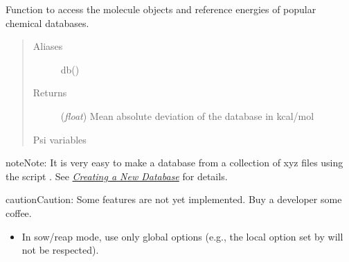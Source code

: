 \documentclass[letterpaper,10pt,english]{sphinxmanual}
\begin{document}
\begin{fulllineitems}
\label{index:wrappers.database}
Function to access the molecule objects and reference energies of
popular chemical databases.
\begin{quote}\begin{description}
\item[{Aliases }] \leavevmode
db()

\item[{Returns}] \leavevmode
(\emph{float}) Mean absolute deviation of the database in kcal/mol

\item[{Psi variables}] \leavevmode
\end{description}\end{quote}

\begin{fulllineitems}
\label{index:envvar-db_nameDATABASEMEANSIGNEDDEVIATION}\label{index:envvar-db_nameDATABASEMEANABSOLUTEDEVIATION}\label{index:envvar-db_nameDATABASEROOT-MEAN-SQUAREDEVIATION}
\end{fulllineitems}


\begin{notice}{note}{Note:}
It is very easy to make a database from a collection of xyz files
using the script .
See {\hyperref[index:sec-beginner-newdatabase]{\emph{Creating a New Database}}} for details.
\end{notice}

\begin{notice}{caution}{Caution:}
Some features are not yet implemented. Buy a developer some coffee.
\begin{itemize}
\item {} 
In sow/reap mode, use only global options (e.g., the local option set by  will not be respected).


\end{itemize}
\end{notice}
\end{fulllineitems}
\end{document}
